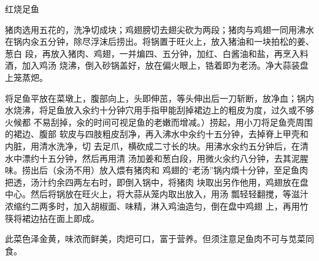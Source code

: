 \begin{recipe}{红烧足鱼}

\ingredients


\preparation

\step 猪肉选用五花的，洗净切成块；鸡翅膀切去翅尖砍为两段；猪肉与鸡翅一同用沸水
在锅内汆五分钟，除尽浮沫后捞出。将锅置于旺火上，放入猪油和一块拍松的姜、葱白
段，再放入猪肉、鸡翅，一并煸四、五分钟，加红、白酱油和盐，再烹入料酒，加入鸡汤
烧沸，倒入砂锅盖好，放在偏火眼上，锆着即为老汤。净大蒜装盘上笼蒸𤆵。

\step 将足鱼平放在菜墩上，腹部向上，头即伸茁，等头伸出后一刀斩断，放净血；锅内
水烧沸，将足鱼放入汆约十分钟穴用手指甲能刮掉裙边上的粗皮为度，过久或不够火候都
不易刮掉，汆的时间可视足鱼的老嫩而增减。）捞起，用小刀将足鱼壳周围的裙边、腹部
软皮与四肢粗皮刮净，再入沸水中汆约十五分钟，去掉脊上甲壳和内脏，用清水洗净，切
去足爪，横砍成二寸长的块。用沸水汆约五分钟后，在清水中漂约十五分钟，然后再用清
汤加姜和葱白段，用微火汆约八分钟，去其泥腥味。捞出后（汆汤不用）放入煨有猪肉和
鸡翅的“老汤”锅内煩十分钟，至足鱼肉把透，汤汁约余四两左右时，即倒入锅中，将猪肉
块取出另作他用，鸡翅放在盘中心。然后将锅放在旺火上，将大蒜从笼内取出放入，用汤
瓢轻轻翻搅，等滋汁浓缩约二两多时，加入胡椒面、味精，淋入鸡油造匀，倒在盘中鸡翅
上，再用竹筷将裙边拈在面上即成。

\features

此菜色泽金黄，味浓而鲜美，肉𤆵可口，富于营养。但须注意足鱼肉不可与苋菜同食。

\end{recipe}

